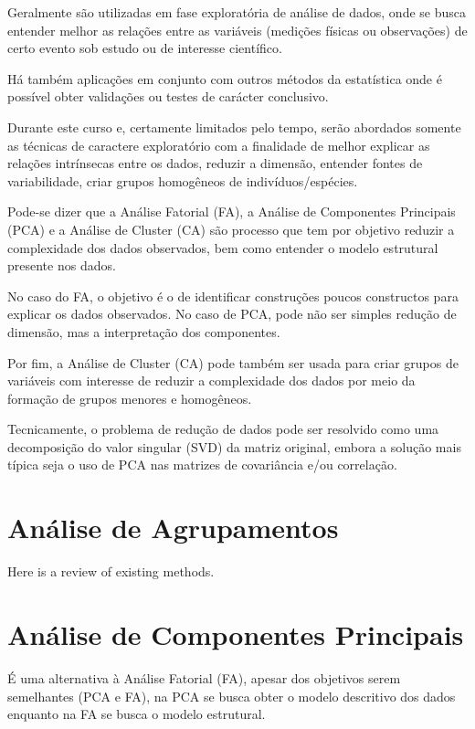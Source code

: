 \documentclass[]{book}
\begin{document}
Geralmente são utilizadas em fase exploratória de análise de dados, onde
se busca entender melhor as relações entre as variáveis (medições
físicas ou observações) de certo evento sob estudo ou de interesse
científico.

Há também aplicações em conjunto com outros métodos da estatística onde
é possível obter validações ou testes de carácter conclusivo.

Durante este curso e, certamente limitados pelo tempo, serão abordados
somente as técnicas de caractere exploratório com a finalidade de melhor
explicar as relações intrínsecas entre os dados, reduzir a dimensão,
entender fontes de variabilidade, criar grupos homogêneos de
indivíduos/espécies.

Pode-se dizer que a Análise Fatorial (FA), a Análise de Componentes
Principais (PCA) e a Análise de Cluster (CA) são processo que tem por
objetivo reduzir a complexidade dos dados observados, bem como entender
o modelo estrutural presente nos dados.

No caso do FA, o objetivo é o de identificar construções poucos
constructos para explicar os dados observados. No caso de PCA, pode não
ser simples redução de dimensão, mas a interpretação dos componentes.

Por fim, a Análise de Cluster (CA) pode também ser usada para criar
grupos de variáveis com interesse de reduzir a complexidade dos dados
por meio da formação de grupos menores e homogêneos.

Tecnicamente, o problema de redução de dados pode ser resolvido como uma
decomposição do valor singular (SVD) da matriz original, embora a
solução mais típica seja o uso de PCA nas matrizes de covariância e/ou
correlação.

\chapter{Análise de Agrupamentos}\label{AA}

Here is a review of existing methods.

\chapter{Análise de Componentes Principais}\label{PCA}

É uma alternativa à Análise Fatorial (FA), apesar dos objetivos serem
semelhantes (PCA e FA), na PCA se busca obter o modelo descritivo dos
dados enquanto na FA se busca o modelo estrutural.
\end{document}
